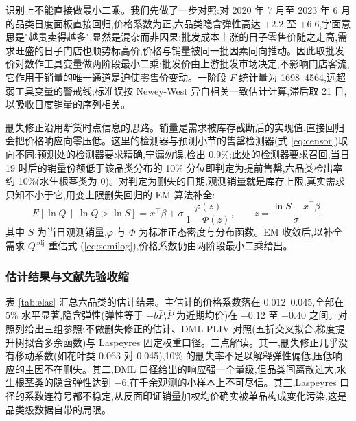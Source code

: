 识别上不能直接做最小二乘。我们先做了一步对照:对 2020 年 7 月至 2023 年 6 月的品类日度面板直接回归,价格系数为正,六品类隐含弹性高达 $+2.2$ 至 $+6.6$,字面意思是"越贵卖得越多",显然是混杂而非因果:批发成本上涨的日子零售价随之走高,需求旺盛的日子门店也顺势标高价,价格与销量被同一批因素同向推动。因此取批发价对数作工具变量做两阶段最小二乘:批发价由上游批发市场决定,不影响门店客流,它作用于销量的唯一通道是迫使零售价变动。一阶段 $F$ 统计量为 1698~4564,远超弱工具变量的警戒线;标准误按 Newey-West 异自相关一致估计计算,滞后取 21 日,以吸收日度销量的序列相关。

删失修正沿用断货时点信息的思路\cite{jain2015}。销量是需求被库存截断后的实现值,直接回归会把价格响应向零压低。这里的检测器与预测小节的售罄检测器(式 \ref{eq:censor})取向不同:预测处的检测器要求精确,宁漏勿误,检出 0.9\%;此处的检测器要求召回,当日 19 时后的销量份额低于该品类分布的 10\% 分位即判定为提前售罄,六品类检出率约 10\%(水生根茎类为 0)。对判定为删失的日期,观测销量就是库存上限,真实需求只知不小于它,用变上限删失回归的 EM 算法补全:
\begin{equation}
  E\!\left[\ln Q\,\middle|\,\ln Q>\ln S\right]
  =x^{\top}\beta+\sigma\,\frac{\varphi(z)}{1-\Phi(z)},
  \qquad z=\frac{\ln S-x^{\top}\beta}{\sigma},
  \label{eq:em}
\end{equation}
其中 $S$ 为当日观测销量,$\varphi$ 与 $\Phi$ 为标准正态密度与分布函数。EM 收敛后,以补全需求 $Q^{\mathrm{adj}}$ 重估式 (\ref{eq:semilog}),价格系数仍由两阶段最小二乘给出。

\subsubsection{估计结果与文献先验收缩}
\label{subsec:eb}

表 \ref{tab:elas} 汇总六品类的估计结果。主估计的价格系数落在 0.012~0.045,全部在 5\% 水平显著,隐含弹性(弹性等于 $-b\bar{P}$,$\bar{P}$ 为近期均价)在 $-0.12$ 至 $-0.40$ 之间。对照列给出三组参照:不做删失修正的估计、DML-PLIV 对照\cite{chernozhukov2018}(五折交叉拟合,梯度提升树拟合多余函数)与 Laspeyres 固定权重口径。三点解读。其一,删失修正几乎没有移动系数(如花叶类 0.063 对 0.045),10\% 的删失率不足以解释弹性偏低,压低响应的主因不在删失。其二,DML 口径给出的响应强一个量级,但品类间离散过大,水生根茎类的隐含弹性达到 $-6$,在千余观测的小样本上不可尽信。其三,Laspeyres 口径的系数连符号都不稳定,从反面印证销量加权均价确实被单品构成变化污染,这是品类级数据自带的局限。

